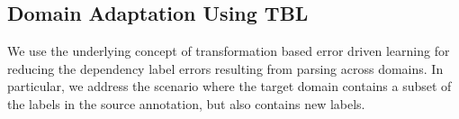 

\subsection{Domain Adaptation Using TBL}

We use the underlying concept of transformation based error driven learning for reducing the dependency label errors resulting from parsing across domains. 
In particular, we address the scenario where the target domain contains a subset of the labels in the source annotation, but also contains new labels.

